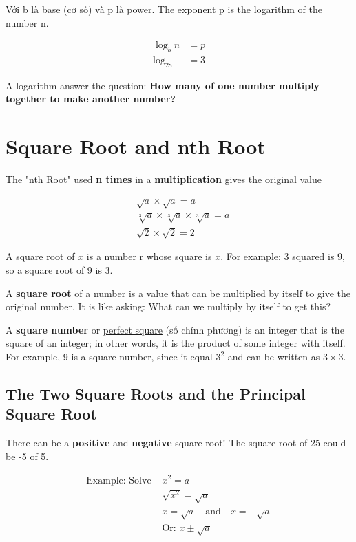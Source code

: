 Với b là base (cơ số) và p là power. The exponent p is the logarithm of the number n.

\begin{equation}
  \begin{aligned}
    \log_bn&=p\\
    \log_28&=3
  \end{aligned}
  \label{log_eqn}
\end{equation}

A logarithm answer the question: \textbf{How many of one number multiply together to make another number?}

\section{Square Root and nth Root}

The "nth Root" used \textbf{n times} in a \textbf{multiplication} gives the original value

\[
  \begin{aligned}
    &\sqrt{a} \times \sqrt{a} = a\\
    &\sqrt[3]{a} \times \sqrt[3]{a} \times \sqrt[3]{a} = a\\
    &\sqrt{2} \times \sqrt{2} = 2
  \end{aligned}
\]

A square root of $x$ is a number r whose square is $x$. For example: 3 squared is 9, so a square root of 9 is 3.

A \textbf{square root} of a number is a value that can be multiplied by itself to give the original number. It is like asking: What can we multiply by itself to get this?

A \textbf{square number} or \href{https://en.wikipedia.org/wiki/Square_number}{perfect square} (số chính phương) is an integer that is the square of an integer; in other words, it is the product of some integer with itself. For example, 9 is a square number, since it equal $3^{2}$ and can be written as $3 \times 3$.

\subsection{The Two Square Roots and the Principal Square Root}

There can be a \textbf{positive} and \textbf{negative} square root! The square root of 25 could be -5 of 5.

\[
  \begin{aligned}
    \text{Example: Solve } &x^{2}=a\\
    &\sqrt{x^{2}}=\sqrt{a}\\
    &x = \sqrt{a} \quad \text{and} \quad x = -\sqrt{a}\\
    &\text{Or: } x \pm \sqrt{a}
  \end{aligned}
\]

